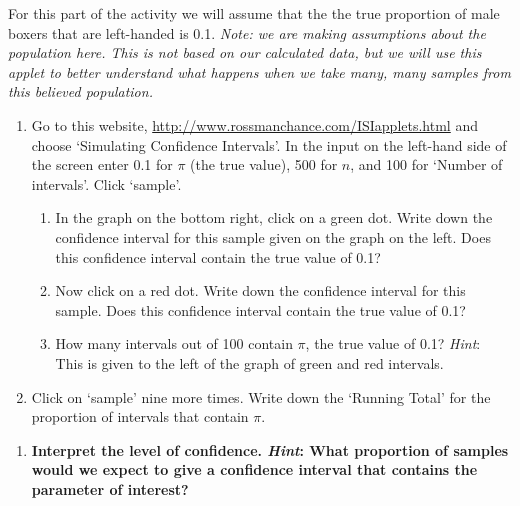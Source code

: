 \documentclass[
]{report}
\providecommand{\tightlist}{%
  \setlength{\itemsep}{0pt}\setlength{\parskip}{0pt}}
\begin{document}
For this part of the activity we will assume that the the true proportion of male boxers that are left-handed is 0.1. \emph{Note: we are making assumptions about the population here. This is not based on our calculated data, but we will use this applet to better understand what happens when we take many, many samples from this believed population.}

\begin{enumerate}
\def\labelenumi{\arabic{enumi}.}
\setcounter{enumi}{8}
\item
  Go to this website, \url{http://www.rossmanchance.com/ISIapplets.html} and choose `Simulating Confidence Intervals'. In the input on the left-hand side of the screen enter 0.1 for \(\pi\) (the true value), 500 for \(n\), and 100 for `Number of intervals'. Click `sample'.
  \vspace{1mm}

  \begin{enumerate}
  \def\labelenumii{\alph{enumii}.}
  \item
    In the graph on the bottom right, click on a green dot. Write down the confidence interval for this sample given on the graph on the left. Does this confidence interval contain the true value of 0.1?
    \vspace{0.5in}
  \item
    Now click on a red dot. Write down the confidence interval for this sample. Does this confidence interval contain the true value of 0.1?
    \vspace{0.5in}
  \item
    How many intervals out of 100 contain \(\pi\), the true value of 0.1? \emph{Hint}: This is given to the left of the graph of green and red intervals.
    \vspace{0.5in}
  \end{enumerate}
\item
  Click on `sample' nine more times. Write down the `Running Total' for the proportion of intervals that contain \(\pi\).
\end{enumerate}

\vspace{0.5in}

\begin{enumerate}
\def\labelenumi{\arabic{enumi}.}
\setcounter{enumi}{10}
\tightlist
\item
  \textbf{Interpret the level of confidence. \emph{Hint}: What proportion of samples would we expect to give a confidence interval that contains the parameter of interest?}
\end{enumerate}
\end{document}
